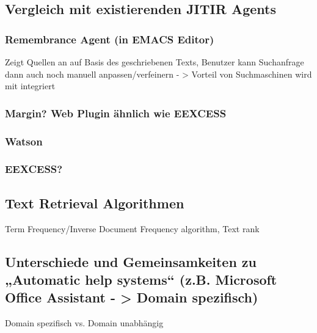 \subsection{Vergleich mit existierenden JITIR Agents}
 	\subsubsection{Remembrance Agent (in EMACS Editor)}
		Zeigt Quellen an auf Basis des geschriebenen Texts, Benutzer kann Suchanfrage dann auch noch manuell anpassen/verfeinern
		- > Vorteil von Suchmaschinen wird mit integriert
 	\subsubsection{Margin? Web Plugin ähnlich wie EEXCESS}
 	\subsubsection{Watson}
 	\subsubsection{EEXCESS?}
\subsection{Text Retrieval Algorithmen}
 		Term Frequency/Inverse Document Frequency algorithm,
 		Text rank
 \subsection{Unterschiede und Gemeinsamkeiten zu „Automatic help systems“ (z.B. Microsoft Office Assistant - > Domain spezifisch)}
 	Domain spezifisch vs. Domain unabhängig